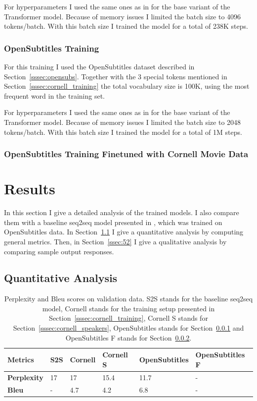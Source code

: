 \documentclass[12pt]{article}
\begin{document}
For hyperparameters I used the same ones as in \cite{Vaswani:2017} for the base variant of the Transformer model. Because of memory issues I limited the batch size to 4096 tokens/batch. With this batch size I trained the model for a total of 238K steps.
\subsubsection{OpenSubtitles Training} \label{sssec:opensubs_training}
For this training I used the OpenSubtitles dataset described in Section~\ref{sssec:opensubs}. Together with the 3 special tokens mentioned in Section~\ref{sssec:cornell_training} the total vocabulary size is 100K, using the most frequent word in the training set.

For hyperparameters I used the same ones as in \cite{Vaswani:2017} for the base variant of the Transformer model. Because of memory issues I limited the batch size to 2048 tokens/batch. With this batch size I trained the model for a total of 1M steps.
\subsubsection{OpenSubtitles Training Finetuned with Cornell Movie Data} \label{sssec:finetune_training}

\newpage\section{Results} \label{sec:results}
In this section I give a detailed analysis of the trained models. I also compare them with a baseline seq2seq model presented in \cite{Vinyals:2015}, which was trained on OpenSubtitles data. In Section~\ref{ssec:51} I give a quantitative analysis by computing general metrics. Then, in Section~\ref{ssec:52} I give a qualitative analysis by comparing sample output responses.
\subsection{Quantitative Analysis} \label{ssec:51}
\begin{table}[H]
	\centering
	\begin{tabular}{|l|l|l|l|l|l|}
		\hline
		\textbf{Metrics} & \textbf{S2S} & \textbf{Cornell} & \textbf{Cornell S} & \textbf{OpenSubtitles} & \textbf{OpenSubtitles F}\\ \hline
		\textbf{Perplexity} & 17 & 17 & 15.4 & 11.7 & -
		\\ \hline
		\textbf{Bleu} & - & 4.7 & 4.2 & 6.8 & -
		\\ \hline
	\end{tabular}
	\caption{Perplexity and Bleu scores on validation data. S2S stands for the baseline seq2seq model, Cornell stands for the training setup presented in Section~\ref{sssec:cornell_training}, Cornell S stands for Section~\ref{sssec:cornell_speakers}, OpenSubtitles stands for Section~\ref{sssec:opensubs_training} and OpenSubtitles F stands for Section~\ref{sssec:finetune_training}.}	
	\label{table:scores}
\end{table}
\end{document}
